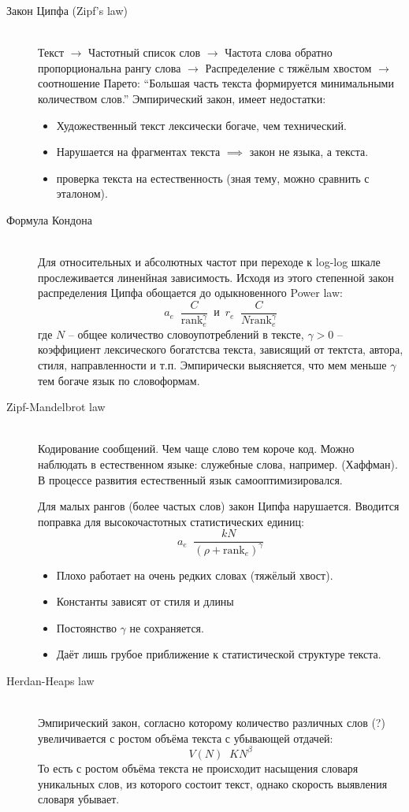 \documentclass[a4paper]{article}
\newcommand{\brac}[1]{{\left ( #1 \right )}}
\newcommand{\defn}{\mathop{\overset{\Delta}{=}}\nolimits}
\newcommand{\eng}[1]{\foreignlanguage{english}{#1}}
\begin{document}
\begin{description}
	\item[Закон Ципфа (\eng{Zipf's law})] \hfill\\
	Текст $\to$ Частотный список слов $\to$ Частота слова обратно пропорциональна рангу слова $\to$ Распределение с тяжёлым хвостом $\to$ соотношение Парето:
	``Большая часть текста формируется минимальными количеством слов.''
	Эмпирический закон, имеет недостатки:
	\begin{itemize}
		\item Художественный текст лексически богаче, чем технический.
		\item Нарушается на фрагментах текста $\implies$ закон не языка, а текста.
		\item проверка текста на естественность (зная тему, можно сравнить с эталоном).
	\end{itemize}


	\item[Формула Кондона] \hfill\\
	Для относительных и абсолютных частот при переходе к \eng{log-log} шкале прослеживается линенйная зависимость. Исходя из этого степенной закон распределения Ципфа обощается до одыкновенного \eng{Power law}:
	\[a_e \defn \frac{C}{\text{rank}_e^\gamma}\,\text{ и }\,r_e \defn \frac{C}{N \text{rank}_e^\gamma}\]
	где $N$ -- общее количество словоупотреблений в тексте,
	$\gamma>0$ -- коэффициент лексического богатстсва текста, зависящий от тектста, автора, стиля, направленности и т.п.
	Эмпирически выясняется, что мем меньше $\gamma$ тем богаче язык по словоформам.

	\item[\eng{Zipf-Mandelbr\:ot law}] \hfill\\
	Кодирование сообщений. Чем чаще слово тем короче код. Можно наблюдать в естественном языке: служебные слова, например. (Хаффман). В процессе развития естественный язык самооптимизировался.

	Для малых рангов (более частых слов) закон Ципфа нарушается. Вводится поправка для высокочастотных статистических единиц:
	\[a_e \defn \frac{k N}{\brac{\rho + \text{rank}_e}^\gamma}\]
	\begin{itemize}
		\item Плохо работает на очень редких словах (тяжёлый хвост).
		\item Константы зависят от стиля и длины
		\item Постоянство $\gamma$ не сохраняется.
		\item Даёт лишь грубое приближение к статистической структуре текста.
	\end{itemize}

	\item[\eng{Herdan-Heaps law}] \hfill\\
	Эмпирический закон, согласно которому количество различных слов (?) увеличивается с ростом объёма текста с убывающей отдачей:
	\[V(N)\defn K N^\beta\]
	То есть с ростом объёма текста не происходит насыщения словаря уникальных слов, из которого состоит текст, однако скорость выявления словаря убывает. 
\end{description}
\end{document}
